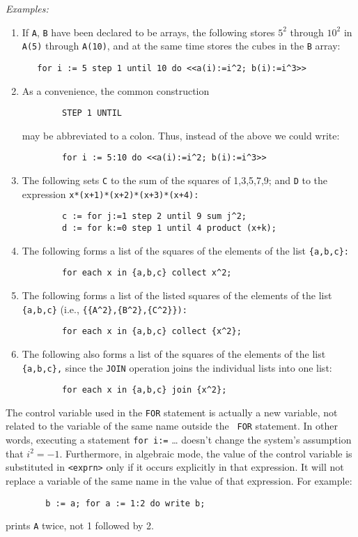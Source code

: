 \documentclass[11pt,letterpaper]{book}
\makeatletter
\newcommand{\underscore}{\_}
\newcommand{\ttindex}[1]{{\renewcommand{\_}{\protect\underscore}%
                          \index{#1@{\tt #1}}}}
\makeatother
\begin{document}
{\it Examples:}
\begin{enumerate}
\item If {\tt A}, {\tt B} have been declared to be arrays, the following
stores $5^{2}$ through $10^{2}$ in {\tt A(5)} through {\tt A(10)}, and at
the same time stores the cubes in the {\tt B} array:
{\small\begin{verbatim}
   for i := 5 step 1 until 10 do <<a(i):=i^2; b(i):=i^3>>
\end{verbatim}}
\item As a convenience, the common construction
{\small\begin{verbatim}
        STEP 1 UNTIL
\end{verbatim}}
may be abbreviated to a colon. Thus, instead of the above we could write:
{\small\begin{verbatim}
        for i := 5:10 do <<a(i):=i^2; b(i):=i^3>>
\end{verbatim}}
\item The following sets {\tt C} to the sum of the squares of 1,3,5,7,9;
and {\tt D} to the expression {\tt x*(x+1)*(x+2)*(x+3)*(x+4):}
{\small\begin{verbatim}
        c := for j:=1 step 2 until 9 sum j^2;
        d := for k:=0 step 1 until 4 product (x+k);
\end{verbatim}}
\item The following forms a list of the squares of the elements of the list
{\tt \{a,b,c\}:}\ttindex{FOR EACH}
{\small\begin{verbatim}
        for each x in {a,b,c} collect x^2;
\end{verbatim}}
\item The following forms a list of the listed squares of the elements of the
list {\tt \{a,b,c\}}
(i.e., {\tt \{\{A\verb|^|2\},\{B\verb|^|2\},\{C\verb|^|2\}\}):}
{\small\begin{verbatim}
        for each x in {a,b,c} collect {x^2};
\end{verbatim}}
\item The following also forms a list of the squares of the elements of
the list {\tt \{a,b,c\},} since the {\tt JOIN} operation joins the
individual lists into one list:\ttindex{FOR EACH}
{\small\begin{verbatim}
        for each x in {a,b,c} join {x^2};
\end{verbatim}}
\end{enumerate}
The control variable used in the {\tt FOR} statement is actually a new
variable, not related to the variable of the same name outside the {\tt
FOR} statement.  In other words, executing a statement {\tt for i:=} \ldots
doesn't change the system's assumption that $i^{2} = -1$.
Furthermore, in algebraic mode, the value of the control variable is
substituted in {\tt <exprn>} only if it occurs explicitly in that
expression.  It will not replace a variable of the same name in the value
of that expression.  For example:
{\small\begin{verbatim}
        b := a; for a := 1:2 do write b;
\end{verbatim}}
prints {\tt A} twice, not 1 followed by 2.
\end{document}
